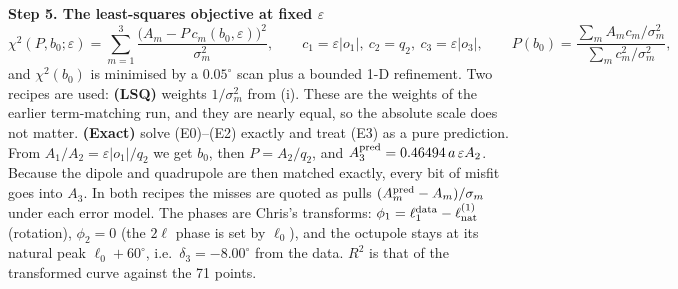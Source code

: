 \documentclass[10pt]{article}
\begin{document}
\medskip\textbf{Step 5. The least-squares objective at fixed $\varepsilon$}
\[
\chi^2(P,b_0;\varepsilon)=\sum_{m=1}^{3}\frac{\big(A_m-P\,c_m(b_0,\varepsilon)\big)^2}{\sigma_m^2},\qquad c_1=\varepsilon|o_1|,\ c_2=q_2,\ c_3=\varepsilon|o_3|,\qquad
P(b_0)=\frac{\sum_m A_mc_m/\sigma_m^2}{\sum_m c_m^2/\sigma_m^2},
\]
and $\chi^2(b_0)$ is minimised by a $0.05^\circ$ scan plus a bounded 1-D refinement. Two recipes are used:
\textbf{(LSQ)} weights $1/\sigma_m^2$ from (i). These are the weights of the earlier term-matching run, and they are nearly equal, so the absolute scale does not matter.
\textbf{(Exact)} solve (E0)--(E2) exactly and treat (E3) as a pure prediction. From $A_1/A_2=\varepsilon|o_1|/q_2$ we get $b_0$, then $P=A_2/q_2$, and $A_3^{\rm pred}=0.46494\,a\,\varepsilon A_2$.
Because the dipole and quadrupole are then matched exactly, every bit of misfit goes into $A_3$.
In both recipes the misses are quoted as pulls $(A^{\rm pred}_m-A_m)/\sigma_m$ under each error model. The phases are Chris's transforms: $\phi_1=\ell_1^{\rm data}-\ell^{(1)}_{\rm nat}$ (rotation), $\phi_2=0$ (the $2\ell$ phase is set by $\ell_0$), and the octupole stays at its natural peak $\ell_0+60^\circ$, i.e.\ $\delta_3=-8.00^\circ$ from the data.
$R^2$ is that of the transformed curve against the 71 points.
\end{document}
